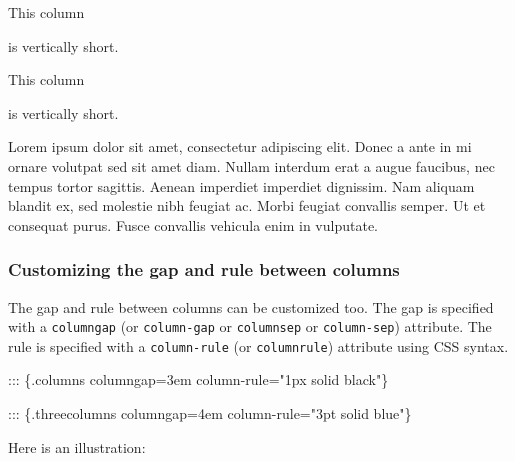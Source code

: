 \documentclass[
]{article}
\newenvironment{Shaded}{}{}
\newcommand{\NormalTok}[1]{#1}
\begin{document}
{\raggedcolumns\begin{multicols}{3}

This column

is vertically short.

\columnbreak

This column

is vertically short.

\columnbreak

Lorem ipsum dolor sit amet, consectetur adipiscing elit. Donec a ante in
mi ornare volutpat sed sit amet diam. Nullam interdum erat a augue
faucibus, nec tempus tortor sagittis. Aenean imperdiet imperdiet
dignissim. Nam aliquam blandit ex, sed molestie nibh feugiat ac. Morbi
feugiat convallis semper. Ut et consequat purus. Fusce convallis
vehicula enim in vulputate.

\end{multicols}
}

\hypertarget{customizing-the-gap-and-rule-between-columns}{%
\subsubsection{Customizing the gap and rule between
columns}\label{customizing-the-gap-and-rule-between-columns}}

The gap and rule between columns can be customized too. The gap is
specified with a \texttt{columngap} (or \texttt{column-gap} or
\texttt{columnsep} or \texttt{column-sep}) attribute. The rule is
specified with a \texttt{column-rule} (or \texttt{columnrule}) attribute
using CSS syntax.

\begin{Shaded}
\begin{Highlighting}[]
\NormalTok{::: \{.columns columngap=3em column{-}rule="1px solid black"\}}

\NormalTok{::: \{.threecolumns columngap=4em column{-}rule="3pt solid blue"\}}
\end{Highlighting}
\end{Shaded}

Here is an illustration:
\end{document}
